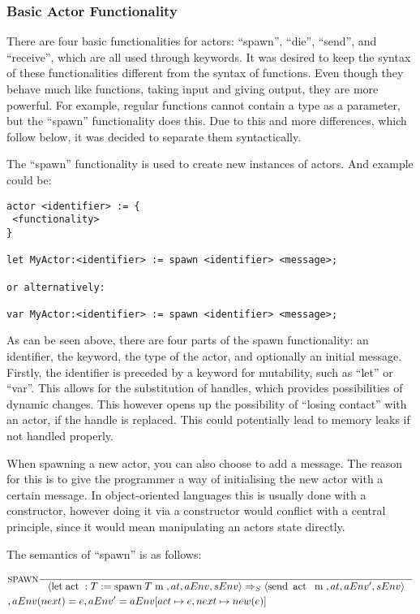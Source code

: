 \subsubsection{Basic Actor Functionality}
\label{subsubsec:BasicActorFunctionality}
There are four basic functionalities for actors: \enquote{spawn}, \enquote{die}, \enquote{send}, and \enquote{receive}, which are all used through keywords. It was desired to keep the syntax of these functionalities different from the syntax of functions. Even though they behave much like functions, taking input and giving output, they are more powerful. For example, regular functions cannot contain a type as a parameter, but the \enquote{spawn} functionality does this. Due to this and more differences, which follow below, it was decided to separate them syntactically.

The \enquote{spawn} functionality is used to create new instances of actors. And example could be:

\label{actorfuncSpawn}
\begin{lstlisting}
actor <identifier> := {
 <functionality>
}

let MyActor:<identifier> := spawn <identifier> <message>;

or alternatively:

var MyActor:<identifier> := spawn <identifier> <message>;
\end{lstlisting}

As can be seen above, there are four parts of the spawn functionality: an identifier, the keyword, the type of the actor, and optionally an initial message. Firstly, the identifier is preceded by a keyword for mutability, such as \enquote{let} or \enquote{var}. This allows for the substitution of handles, which provides possibilities of dynamic changes. This however opens up the possibility of \enquote{losing contact} with an actor, if the handle is replaced. This could potentially lead to memory leaks if not handled properly.

When spawning a new actor, you can also choose to add a message. The reason for this is to give the programmer a way of initialising the new actor with a certain message. In object-oriented languages this is usually done with a constructor, however doing it via a constructor would conflict with a central principle, since it would mean manipulating an actors state directly.

The semantics of \enquote{spawn} is as follows:

\begin{align*}
&\inference[$\text{SPAWN}$]{}
                       {\Braket{\Tlet \Tact:T := \Tspawn \; T \Tm,at,aEnv,sEnv} \Rightarrow_S \Braket{\Tsend \Tact \Tm,at,aEnv',sEnv}}
\\
&                       {, aEnv(next) = e, aEnv' = aEnv[act \mapsto e, next \mapsto new(e)]}
\end{align*}

